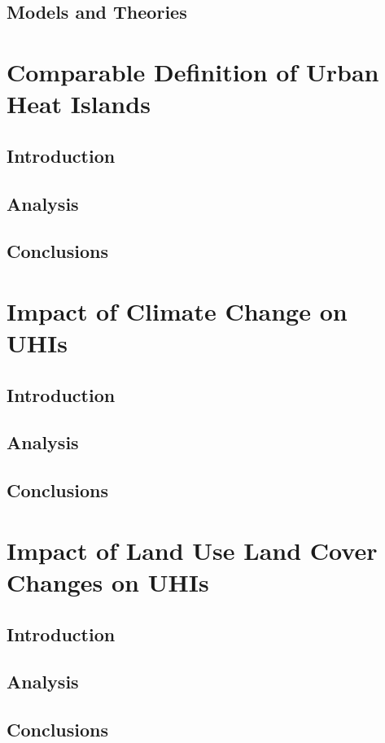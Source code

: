\documentclass[a4paper, english]{article}
\begin{document}
    \subsection{Models and Theories}

\section{Comparable Definition of Urban Heat Islands}
    \subsection{Introduction}
    \subsection{Analysis}
    \subsection{Conclusions}

\section{Impact of Climate Change on UHIs}
    \subsection{Introduction}
    \subsection{Analysis}
    \subsection{Conclusions}

\section{Impact of Land Use Land Cover Changes on UHIs}
    \subsection{Introduction}
    \subsection{Analysis}
    \subsection{Conclusions}
\end{document}
